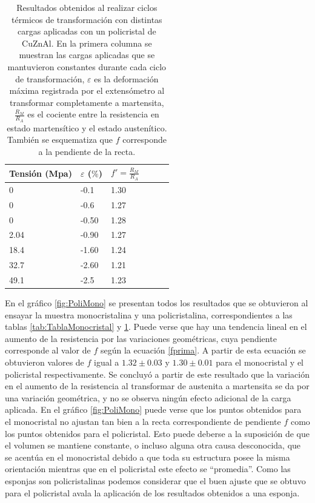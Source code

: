 \documentclass[a4paper,12pt,fleqn,twoside,openany]{book}
\begin{document}
\begin{table} 
\begin{center} 
\begin{tabular}{@{}llllll@{}} \toprule
Tensión (Mpa) & $\varepsilon$ ($\%$) &  $f'=\frac{R_M}{R_A}$\\ \midrule
 0        &  -0.1   & 1.30\\
 0       &  -0.6   & 1.27 \\
 0      &  -0.50   & 1.28 \\
 2.04      &  -0.90  & 1.27\\
 18.4    &  -1.60  & 1.24 \\
32.7      &  -2.60 & 1.21\\
 49.1     &  -2.5  & 1.23   \\
 \bottomrule
\end{tabular}
\caption{Resultados obtenidos al realizar ciclos térmicos de transformación con distintas cargas aplicadas con un policristal de CuZnAl. En la primera columna se muestran las cargas aplicadas que se mantuvieron constantes durante cada ciclo de transformación, $\varepsilon$ es la deformación máxima registrada por el extensómetro al transformar completamente a martensita, $\frac{R_M}{R_A}$ es el cociente entre la resistencia en estado martensítico y el estado austenítico. También se esquematiza que $f$ corresponde a la pendiente de la recta.}
\label{tab:TablaPolicristal}
\end{center}
\end{table}

En el gráfico \ref{fig:PoliMono} se presentan todos los resultados que se obtuvieron al ensayar la muestra monocristalina y una policristalina, correspondientes a las tablas \ref{tab:TablaMonocristal} y \ref{tab:TablaPolicristal}. Puede verse que hay una tendencia lineal en el aumento de la resistencia por las variaciones geométricas, cuya pendiente corresponde al valor de $f$ según la ecuación \ref{fprima}. A partir de esta ecuación se obtuvieron valores de $f$ igual a $1.32\pm0.03$ y $1.30 \pm 0.01$ para el monocristal y el policristal respectivamente.  Se concluyó a partir de este resultado que la variación en el aumento de la resistencia al transformar de austenita a martensita se da por una variación geométrica, y no se observa ningún efecto adicional de la carga aplicada.
En el gráfico \ref{fig:PoliMono} puede verse que los puntos obtenidos para el monocristal no ajustan tan bien a la recta correspondiente de pendiente $f$ como los puntos obtenidos para el policristal. Esto puede deberse a la suposición de que el volumen se mantiene constante, o incluso alguna otra causa desconocida, que se acentúa en el monocristal debido a que toda su estructura posee la misma orientación mientras que en el policristal este efecto se ``promedia''. Como las esponjas son policristalinas podemos considerar que el buen ajuste que se obtuvo para el policristal avala la aplicación de los resultados obtenidos a una esponja.
\end{document}
